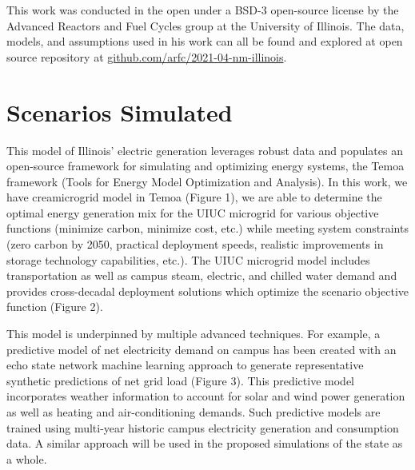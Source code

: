 This work was conducted in the open under a BSD-3 open-source license by the 
Advanced Reactors and Fuel Cycles group at the University of Illinois. The 
data, models, and assumptions used in his work can all be found and explored at 
open source repository at 
\href{https://github.com/arfc/2021-04-nm-illinois}{github.com/arfc/2021-04-nm-illinois}.




\section{Scenarios Simulated}\label{sec:simulations}

This model of Illinois' electric generation leverages robust data and populates 
an open-source framework for simulating and optimizing energy systems, 
the Temoa framework (Tools for Energy Model Optimization and Analysis). In this 
work, we have creamicrogrid model in Temoa (Figure 1), we are able to determine the optimal energy generation mix 
for the UIUC microgrid for various objective functions (minimize carbon, 
minimize cost, etc.) while meeting system constraints (zero carbon by 2050, 
practical deployment speeds, realistic improvements in storage technology 
capabilities, etc.). The UIUC microgrid model includes transportation as well 
as campus steam, electric, and chilled water demand and provides cross-decadal 
deployment solutions which optimize the scenario objective function (Figure 2).

This model is underpinned by multiple advanced techniques. For example, a 
predictive model of net electricity demand on campus has been created with an 
echo state network machine learning approach to generate representative 
synthetic predictions of net grid load (Figure 3). This predictive model 
incorporates weather information to account for solar and wind power generation 
as well as heating and air-conditioning demands. Such predictive models are 
trained using multi-year historic campus electricity generation and consumption 
data. A similar approach will be used in the proposed simulations of the state 
as a whole.




